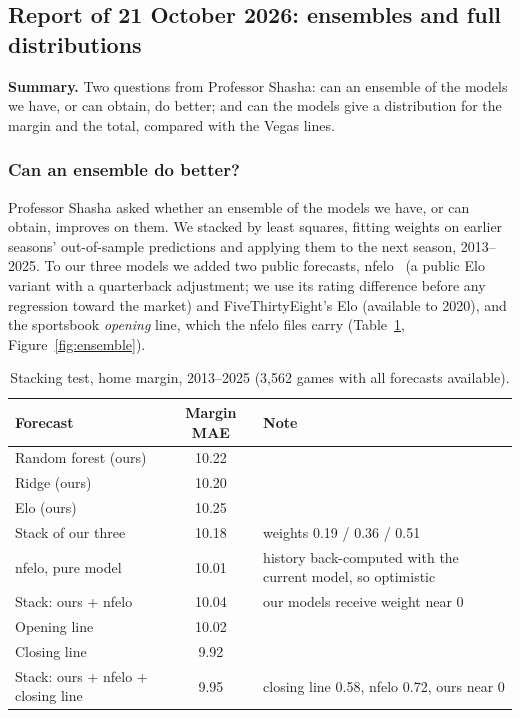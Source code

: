 \subsection{Report of 21 October 2026: ensembles and full distributions}\label{sec:w1021}

\textbf{Summary.} Two questions from Professor Shasha: can an ensemble of the models we have, or can obtain, do better; and can the models give a distribution for the margin and the total, compared with the Vegas lines.

\subsubsection{Can an ensemble do better?}

Professor Shasha asked whether an ensemble of the models we have, or can obtain, improves on them. We stacked by least squares, fitting weights on earlier seasons' out-of-sample predictions and applying them to the next season, 2013--2025. To our three models we added two public forecasts, nfelo~\cite{nfelo} (a public Elo variant with a quarterback adjustment; we use its rating difference before any regression toward the market) and FiveThirtyEight's Elo (available to 2020), and the sportsbook \emph{opening} line, which the nfelo files carry (Table~\ref{tab:ensemble}, Figure~\ref{fig:ensemble}).

\begin{table}[H]
\centering
\small
\begin{tabular}{lcp{6cm}}
\toprule
\textbf{Forecast} & \textbf{Margin MAE} & \textbf{Note} \\
\midrule
Random forest (ours) & 10.22 & \\
Ridge (ours) & 10.20 & \\
Elo (ours) & 10.25 & \\
Stack of our three & 10.18 & weights 0.19 / 0.36 / 0.51 \\
nfelo, pure model & 10.01 & history back-computed with the current model, so optimistic \\
Stack: ours + nfelo & 10.04 & our models receive weight near 0 \\
Opening line & 10.02 & \\
Closing line & 9.92 & \\
Stack: ours + nfelo + closing line & 9.95 & closing line 0.58, nfelo 0.72, ours near 0 \\
\bottomrule
\end{tabular}
\caption{Stacking test, home margin, 2013--2025 (3,562 games with all forecasts available).}
\label{tab:ensemble}
\end{table}

